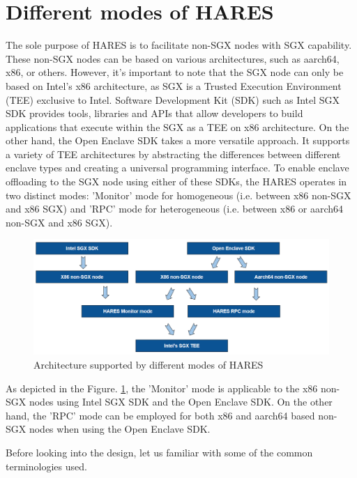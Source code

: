 \documentclass[article, doublespace,nopageskip]{VTthesis} %
\newcommand{\monitor}{HARES }
\begin{document}
    \section{Different modes of \monitor} \label{ase:monitor design}
    The sole purpose of \monitor is to facilitate non-SGX nodes with SGX capability. These non-SGX nodes can be based on various architectures, such as aarch64, x86, or others.  However, it's important to note that the SGX node can only be based on Intel's x86 architecture, as SGX is a Trusted Execution Environment (TEE) exclusive to Intel. Software Development Kit (SDK) such as Intel SGX SDK \cite{Intel-SGX} provides tools, libraries and APIs that allow developers to build applications that execute within the SGX as a TEE on x86 architecture. On the other hand, the Open Enclave SDK \cite{Open-Enclave} takes a more versatile approach. It supports a variety of TEE architectures by abstracting the differences between different enclave types and creating a universal programming interface. To enable enclave offloading to the SGX node using either of these SDKs, the \monitor operates in two distinct modes: 'Monitor' mode for homogeneous (i.e. between x86 non-SGX and x86 SGX) and 'RPC' mode for heterogeneous (i.e. between x86 or aarch64 non-SGX and x86 SGX). 

    \begin{figure}[htb]
	    \centering
		\includegraphics[scale=1.3]{figures/Arch_support_sgx2.png}
		\caption{Architecture supported by different modes of \monitor} 
		\label{fig:arch_supported}
	\end{figure}

    As depicted in the Figure. \ref{fig:arch_supported}, the 'Monitor' mode is applicable to the  x86 non-SGX nodes using Intel SGX SDK and the Open Enclave SDK. On the other hand, the 'RPC' mode can be employed for both x86 and aarch64 based non-SGX nodes when using the Open Enclave SDK. 

    Before looking into the design, let us familiar with some of the common terminologies used.
\end{document}
